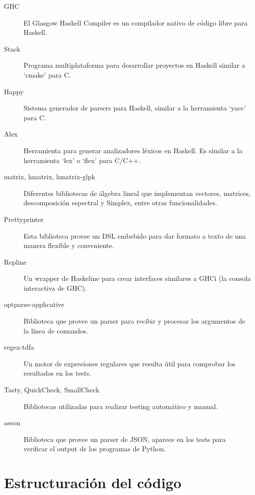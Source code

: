 \begin{description}
    \item[GHC] El Glasgow Haskell Compiler es un compilador nativo de código libre para Haskell.
    \item[Stack] Programa multiplataforma para desarrollar proyectos en Haskell similar a `cmake' para C.
    \item[Happy] Sistema generador de parsers para Haskell, similar a la herramienta `yacc' para C.
    \item[Alex] Herramienta para generar analizadores léxicos en Haskell. Es similar a la herramienta `lex' o `flex' para C/C++.
    \item[matrix, hmatrix, hmatrix-glpk] Diferentes bibliotecas de álgebra lineal que implementan vectores, matrices, descomposición espectral y Simplex, entre otras funcionalidades.
    \item[Prettyprinter] Esta biblioteca provee un DSL embebido para dar formato a texto de una manera flexible y conveniente.
    \item[Repline] Un wrapper de Haskeline para crear interfaces similares a GHCi (la consola interactiva de GHC).
    \item[optparse-applicative] Biblioteca que provee un parser para recibir y procesar los argumentos de la línea de comandos.
    \item[regex-tdfa] Un motor de expresiones regulares que resulta útil para comprobar los resultados en los tests.
    \item[Tasty, QuickCheck, SmallCheck] Bibliotecas utilizadas para realizar testing automático y manual.
    \item[aeson] Biblioteca que provee un parser de JSON, aparece en los tests para verificar el output de los programas de Python.
\end{description}




\section{Estructuración del código}

